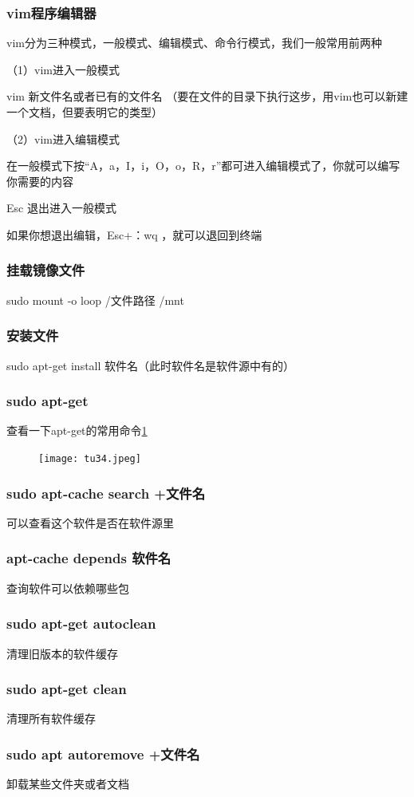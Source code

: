 \documentclass[12pt]{article}
\begin{document}
\subsubsection{vim程序编辑器}
vim分为三种模式，一般模式、编辑模式、命令行模式，我们一般常用前两种

（1）vim进入一般模式

vim 新文件名或者已有的文件名  （要在文件的目录下执行这步，用vim也可以新建一个文档，但要表明它的类型）

（2）vim进入编辑模式

在一般模式下按“A，a，I，i，O，o，R，r”都可进入编辑模式了，你就可以编写你需要的内容

Esc 退出进入一般模式

如果你想退出编辑，Esc+：wq ，就可以退回到终端
\subsubsection{挂载镜像文件}
sudo mount -o loop /文件路径 /mnt
\subsubsection{安装文件}
sudo apt-get install 软件名（此时软件名是软件源中有的）
\subsubsection{sudo apt-get}
查看一下apt-get的常用命令\ref{tu34}
\begin{figure}[!htb] %
\centering
\texttt{[image: tu34.jpeg]}
\caption{}
\label{tu34}
\end{figure} 
\subsubsection{sudo apt-cache search +文件名}
可以查看这个软件是否在软件源里
\subsubsection{apt-cache depends 软件名}
查询软件可以依赖哪些包
\subsubsection{sudo apt-get autoclean}
 清理旧版本的软件缓存
\subsubsection{sudo apt-get clean}
清理所有软件缓存
\subsubsection{sudo apt autoremove +文件名}
卸载某些文件夹或者文档
\end{document}
